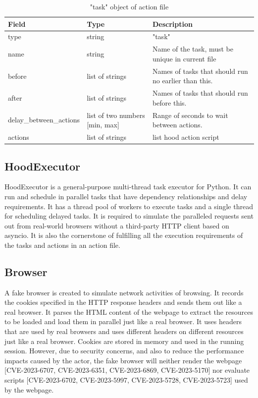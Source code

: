 \documentclass[mscthesis]{usiinfthesis}
\begin{document}
\begin{table}[H]
  \centering
  \begin{tabular}{|p{34mm}|p{26mm}|p{65mm}|}
    \hline
    Field                   & Type                           & Description                                          \\
    \hline
    type                    & string                         & "task"                                               \\
    name                    & string                         & Name of the task, must be unique in current file     \\
    before                  & list of strings                & Names of tasks that should run no earlier than this. \\
    after                   & list of strings                & Names of tasks that should run before this.          \\
    delay\_between\_actions & list of two numbers [min, max] & Range of seconds to wait between actions.            \\
    actions                 & list of strings                & list hood action script                              \\
    \hline
  \end{tabular}
  \caption{"task" object of action file}
  \label{tab:task_object}
\end{table}

\subsection{HoodExecutor}
HoodExecutor is a general-purpose multi-thread task executor for Python. It can run and schedule in parallel tasks that have dependency relationships and delay requirements. It has a thread pool of workers to execute tasks and a single thread for scheduling delayed tasks. It is required to simulate the paralleled requests sent out from real-world browsers without a third-party HTTP client based on asyncio. It is also the cornerstone of fulfilling all the execution requirements of the tasks and actions in an action file.

\subsection{Browser}\label{sec:browser}
A fake browser is created to simulate network activities of browsing. It records the cookies specified in the HTTP response headers and sends them out like a real browser. It parses the HTML content of the webpage to extract the resources to be loaded and load them in parallel just like a real browser. It uses headers that are used by real browsers and uses different headers on different resources just like a real browser. Cookies are stored in memory and used in the running session. However, due to security concerns, and also to reduce the performance impacts caused by the actor, the fake browser will neither render the webpage [CVE-2023-6707, CVE-2023-6351, CVE-2023-6869, CVE-2023-5170] nor evaluate scripts [CVE-2023-6702, CVE-2023-5997, CVE-2023-5728, CVE-2023-5723] used by the webpage. 
\end{document}

